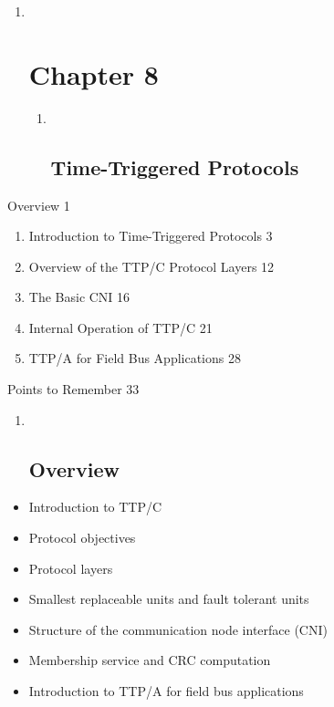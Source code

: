 \begin{enumerate}
\item ~
  \section{Chapter 8}\label{chapter-8}

  \begin{enumerate}
  \item ~
    \subsection{Time-Triggered
    Protocols}\label{time-triggered-protocols}
  \end{enumerate}
\end{enumerate}

Overview 1

\begin{enumerate}
\def\labelenumi{\arabic{enumi}.}
\item
  Introduction to Time-Triggered Protocols 3
\item
  Overview of the TTP/C Protocol Layers 12
\item
  The Basic CNI 16
\item
  Internal Operation of TTP/C 21
\item
  TTP/A for Field Bus Applications 28
\end{enumerate}

Points to Remember 33

\begin{enumerate}
\item ~
  \subsection{}\label{section}

  \subsection{Overview}\label{overview}
\end{enumerate}

\begin{itemize}
\item
  Introduction to TTP/C
\item
  Protocol objectives
\item
  Protocol layers
\item
  Smallest replaceable units and fault tolerant units
\item
  Structure of the communication node interface (CNI)
\item
  Membership service and CRC computation
\item
  Introduction to TTP/A for field bus applications
\end{itemize}

